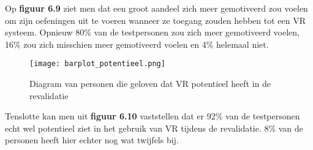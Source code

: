 Op \textbf{figuur 6.9} ziet men dat een groot aandeel zich meer gemotiveerd zou voelen om zijn oefeningen uit te voeren wanneer ze toegang zouden hebben tot een VR systeem. Opnieuw 80\% van de testpersonen zou zich meer gemotiveerd voelen, 16\% zou zich misschien meer gemotiveerd voelen en 4\% helemaal niet.

\begin{figure}[h]
    \centering
    \texttt{[image: barplot\_potentieel.png]}
    \caption{Diagram van personen die geloven dat VR potentieel heeft in de revalidatie}
    \label{figuur 6.10}
\end{figure}

Tenslotte kan men uit \textbf{figuur 6.10} vaststellen dat er 92\% van de testpersonen echt wel potentieel ziet in het gebruik van VR tijdens de revalidatie. 8\% van de personen heeft hier echter nog wat twijfels bij.

